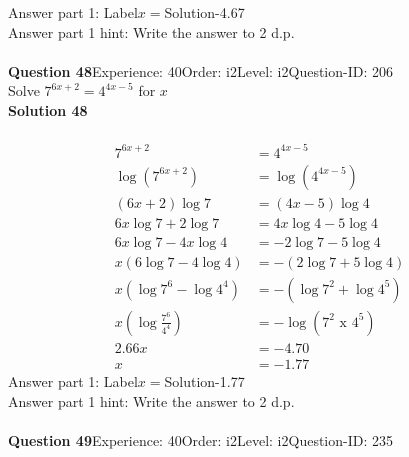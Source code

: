 \documentclass{article}
\begin{document}
Answer part 1: \hspace{10pt}Label\hspace{10pt}$x=$\hspace{10pt}Solution\hspace{10pt}-4.67\\
Answer part 1 hint: \hspace{15pt}Write the answer to 2 d.p.\\
\\[4pt]
\noindent\textbf{Question 48}\hspace{20pt}Experience: 40\hspace{20pt}Order: i2\hspace{20pt}Level: i2\hspace{20pt}Question-ID: 206\\[2pt]
Solve $7^{6x+2}=4^{4x-5}$ for $x$\\[4pt]
\noindent\textbf{Solution 48}\\[2pt]
\\[-35pt]\begin{align*}
7^{6x+2}&=4^{4x-5}\\[2pt]
\log(7^{6x+2})&=\log(4^{4x-5})\\[2pt]
(6x+2)\log7&=(4x-5)\log4\\[2pt]
6x\log7+2\log7&=4x\log4-5\log4\\[2pt]
6x\log7-4x\log4&=-2\log7-5\log4\\[2pt]
x(6\log7-4\log4)&=-(2\log7+5\log4)\\[2pt]
x(\log7^6-\log4^4)&=-(\log7^2+\log4^5)\\[2pt]
x\left(\log\displaystyle\frac{7^6}{4^4}\right)&=-\log(7^2 \,\, \text{x} \,\, 4^5)\\[2pt]
2.66x&=-4.70\\[2pt]
x&=-1.77
\end{align*}
Answer part 1: \hspace{10pt}Label\hspace{10pt}$x=$\hspace{10pt}Solution\hspace{10pt}-1.77\\
Answer part 1 hint: \hspace{15pt}Write the answer to 2 d.p.\\
\\[4pt]
\noindent\textbf{Question 49}\hspace{20pt}Experience: 40\hspace{20pt}Order: i2\hspace{20pt}Level: i2\hspace{20pt}Question-ID: 235\\[2pt]
\end{document}
